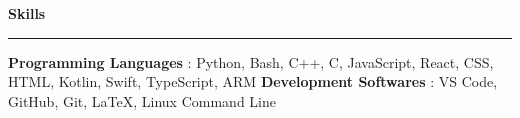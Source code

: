 \textbf{Skills} 
 \par\noindent\rule{\textwidth}{0.2pt} 
\noindent 
 {\textbf{Programming Languages} : {Python, Bash, C++, C, JavaScript, React, CSS, HTML, Kotlin, Swift, TypeScript, ARM}} 
\noindent 
 {\textbf{Development Softwares} : {VS Code, GitHub, Git, LaTeX, Linux Command Line}} 


